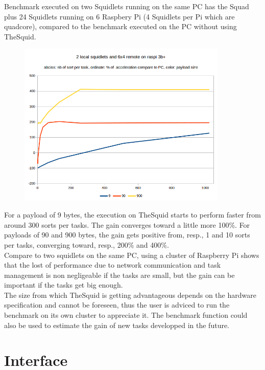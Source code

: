 Benchmark executed on two Squidlets running on the same PC has the Squad plus 24 Squidlets running on 6 Raspbery Pi (4 Squidlets per Pi which are quadcore), compared to the benchmark executed on the PC without using TheSquid.

\begin{center}
\begin{figure}[H]
\centering\includegraphics[width=10cm]{./benchmark02.png}\\
\end{figure}
\end{center}

For a payload of 9 bytes, the execution on TheSquid starts to perform faster from around 300 sorts per tasks. The gain converges toward a little more 100\%. For payloads of 90 and 900 bytes, the gain gets positive from, resp., 1 and 10 sorts per tasks, converging toward, resp., 200\% and 400\%.\\

Compare to two squidlets on the same PC, using a cluster of Raspberry Pi shows that the lost of performance due to network communication and task management is non negligeable if the tasks are small, but the gain can be important if the tasks get big enough.\\

The size from which TheSquid is getting advantageous depends on the hardware specification and cannot be foreseen, thus the user is adviced to run the benchmark on its own cluster to appreciate it. The benchmark function could also be used to estimate the gain of new tasks developped in the future.\\ 

\section{Interface}

